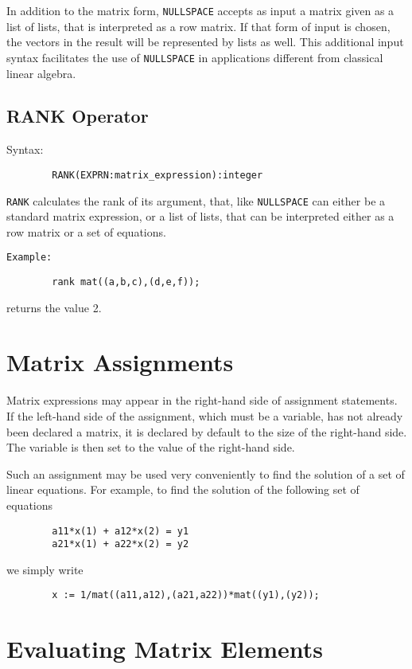 In addition to the {\REDUCE} matrix form, {\tt NULLSPACE} accepts as input a
matrix given as a list of lists, that is interpreted as a row matrix.  If
that form of input is chosen, the vectors in the result will be
represented by lists as well.  This additional input syntax facilitates
the use of {\tt NULLSPACE} in applications different from classical linear
algebra.

\subsection{RANK Operator}

Syntax:
\begin{verbatim}
        RANK(EXPRN:matrix_expression):integer
\end{verbatim}
{\tt RANK} calculates the rank of its argument, that, like {\tt NULLSPACE}
can either be a standard matrix expression, or a list of lists, that can
be interpreted either as a row matrix or a set of equations.

{\tt Example:}

\begin{verbatim}
        rank mat((a,b,c),(d,e,f));
\end{verbatim}
returns the value 2.

\section{Matrix Assignments} 

Matrix expressions may appear in the right-hand side of assignment
statements. If the left-hand side of the assignment, which must be a
variable, has not already been declared a matrix, it is declared by default
to the size of the right-hand side. The variable is then set to the value
of the right-hand side.

Such an assignment may be used very conveniently to find the solution of a
set of linear equations. For example, to find the solution of the
following set of equations
\begin{verbatim}
        a11*x(1) + a12*x(2) = y1
        a21*x(1) + a22*x(2) = y2
\end{verbatim}
we simply write
\begin{verbatim}
        x := 1/mat((a11,a12),(a21,a22))*mat((y1),(y2));
\end{verbatim}

\section{Evaluating Matrix Elements}

